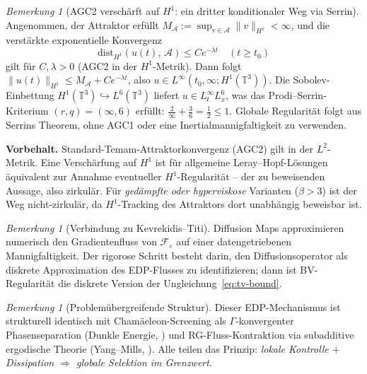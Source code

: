 \documentclass[12pt,a4paper]{article}
\theoremstyle{definition}
\theoremstyle{plain}
\theoremstyle{remark}
\newtheorem{remark}[definition]{Bemerkung}
\begin{document}
\begin{remark}[AGC2 versch\"arft auf $H^1$: ein dritter konditionaler Weg via Serrin]\label{rem:agc2-H1-serrin}
Angenommen, der Attraktor erf\"ullt $M_{\mathcal{A}} := \sup_{v \in \mathcal{A}} \|v\|_{H^1} < \infty$, und die verst\"arkte exponentielle Konvergenz
\[
  \mathrm{dist}_{H^1}(u(t),\,\mathcal{A}) \leq C e^{-\lambda t} \quad (t \geq t_0)
\]
gilt f\"ur $C, \lambda > 0$ \textup{(AGC2 in der $H^1$-Metrik)}.  Dann folgt $\|u(t)\|_{H^1} \leq M_{\mathcal{A}} + C e^{-\lambda t}$, also $u \in L^\infty(t_0,\infty; H^1(\mathbb{T}^3))$.  Die Sobolev-Einbettung $H^1(\mathbb{T}^3) \hookrightarrow L^6(\mathbb{T}^3)$ liefert $u \in L^\infty_t L^6_x$, was das Prodi--Serrin-Kriterium $(r,q) = (\infty,6)$ erf\"ullt: $\tfrac{2}{\infty} + \tfrac{3}{6} = \tfrac{1}{2} \leq 1$.  Globale Regularit\"at folgt aus Serrins Theorem, ohne AGC1 oder eine Inertialmannigfaltigkeit zu verwenden.

\medskip\noindent
\textbf{Vorbehalt.}  Standard-Temam-Attraktorkonvergenz (AGC2) gilt in der $L^2$-Metrik.  Eine Versch\"arfung auf $H^1$ ist f\"ur allgemeine Leray--Hopf-L\"osungen \"aquivalent zur Annahme eventueller $H^1$-Regularit\"at -- der zu beweisenden Aussage, also zirkul\"ar.  F\"ur \emph{ged\"ampfte oder hyperviskose} Varianten ($\beta > 3$) ist der Weg nicht-zirkul\"ar, da $H^1$-Tracking des Attraktors dort unabh\"angig beweisbar ist.
\end{remark}

\begin{remark}[Verbindung zu Kevrekidis--Titi]\label{rem:kevrekidis-edp}
Diffusion Maps \cite{KevrekidisTiti2024} approximieren numerisch den Gradientenfluss von $\mathcal{F}_\varepsilon$ auf einer datengetriebenen Mannigfaltigkeit. Der rigorose Schritt besteht darin, den Diffusionsoperator als diskrete Approximation des EDP-Flusses zu identifizieren; dann ist BV-Regularit\"at die diskrete Version der Ungleichung~\eqref{eq:tv-bound}.
\end{remark}

\begin{remark}[Problemübergreifende Struktur]\label{rem:cross-edp}
Dieser EDP-Mechanismus ist strukturell identisch mit Cham\"aeleon-Screening als $\Gamma$-konvergenter Phasenseparation (Dunkle Energie, \cite{Geiger2026-DE}) und RG-Fluss-Kontraktion via subadditive ergodische Theorie (Yang--Mills, \cite{Geiger2026-YM}). Alle teilen das Prinzip: \emph{lokale Kontrolle $+$ Dissipation $\Rightarrow$ globale Selektion im Grenzwert}.
\end{remark}
\end{document}
